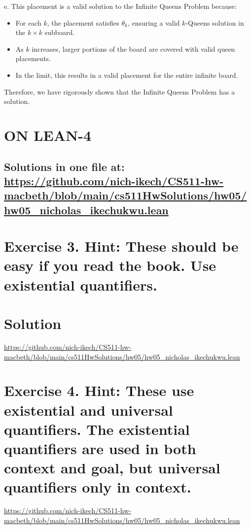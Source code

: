 \documentclass{article}
\begin{document}
e. This placement is a valid solution to the Infinite Queens Problem because:
   \begin{itemize}
     \item For each $k$, the placement satisfies $\theta_k$, ensuring a valid $k$-Queens solution in the $k \times k$ subboard.
     \item As $k$ increases, larger portions of the board are covered with valid queen placements.
     \item In the limit, this results in a valid placement for the entire infinite board.
   \end{itemize}

Therefore, we have rigorously shown that the Infinite Queens Problem has a solution.

\newpage







\section*{ON LEAN-4}
\subsection*{Solutions in one file at: 
\url{https://github.com/nich-ikech/CS511-hw-macbeth/blob/main/cs511HwSolutions/hw05/hw05_nicholas_ikechukwu.lean}}

\newpage

\section*{Exercise 3. Hint: These should be easy if you read the book. Use existential quantifiers.}
\section*{Solution}
\url{https://github.com/nich-ikech/CS511-hw-macbeth/blob/main/cs511HwSolutions/hw05/hw05_nicholas_ikechukwu.lean}

\newpage

\section*{Exercise 4. Hint: These use existential and universal quantifiers. The existential quantifiers are used in both
context and goal, but universal quantifiers only in context.}

\url{https://github.com/nich-ikech/CS511-hw-macbeth/blob/main/cs511HwSolutions/hw05/hw05_nicholas_ikechukwu.lean}
\end{document}

